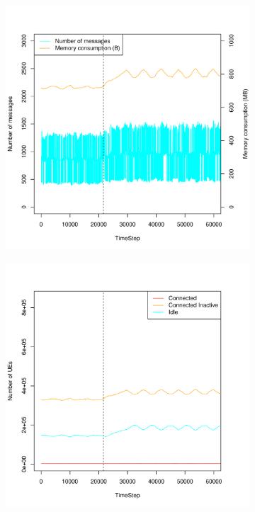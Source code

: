\documentclass[a4j]{ujarticle}
\begin{document}
\begin{figure}[htbp]
\begin{subfigure}{0.49\hsize}
   \label{subfig:scenario_6_idleTimer_345600_691200_1-5_0_0_0_ideal_add_80000}
 \end{subfigure}
 \par\bigskip %
 \begin{subfigure}{0.49\hsize}
   \centering
   \includegraphics[width=1.0\hsize]{scenario_6_signaling_and_memoryload_vs_timeStep_345600_691200_1-5_0_0_0_ideal_add_80000.pdf}
   \label{subfig:scenario_6_signaling_and_memoryload_vs_timeStep_345600_691200_1-5_0_0_0_ideal_add_80000}
 \end{subfigure}
 \begin{subfigure}{0.49\hsize}
   \centering
   \includegraphics[width=1.0\hsize]{scenario_6_stateBreakdown_345600_691200_1-5_0_0_0_ideal_add_80000.pdf}

\end{subfigure}
\end{figure}
\end{document}
